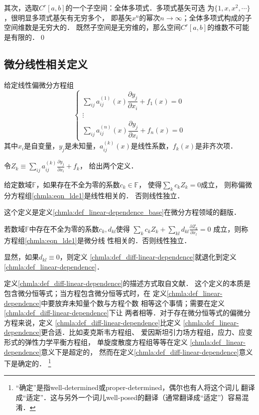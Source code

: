 其次，选取$C^r[a,b]$的一个子空间：全体多项式．多项式基矢可选
为$\{1,x,x^2,\cdots \}$，很明显多项式基矢有无穷多个，
即基矢$x^n$的幂次$n\to \infty$；全体多项式构成的子空间维数是无穷大的．
既然子空间是无穷维的，那么空间$C^r[a,b]$的维数不可能是有限的．\qed




\subsection{微分线性相关定义}\label{chmla:sec_diff-linear-dependence}
给定线性偏微分方程组
\begin{equation}\label{chmla:eqn_lde1}
    \left\{ {\begin{array}{*{20}{c}}
            \sum\limits_{ij} {a_{ij}^{( 1 )}(x)\dfrac{{\partial {y_j}}}{{\partial {x_i}}}}  + {f_1}(x) = 0  \\
            \vdots \\
            \sum\limits_{ij} {a_{ij}^{( n )}(x)\dfrac{{\partial {y_j}}}{{\partial {x_i}}}}  + {f_n}(x) = 0
    \end{array}} \right.
\end{equation}
其中$x_i$是自变量，$y_j$是未知量，$a_{ij}^{( k )}(x)$是线性系数，$f_k(x)$是非齐次项．

令${Z_k} \equiv\sum_{ij}{a_{ij}^{( k )}\frac{{\partial {y_j}}}{{\partial {x_i}}}}  + {f_k}$，
给出两个定义．
\begin{definition}\label{chmla:def_linear-dependence}
    给定数域$\mathbb{F}$，如果存在不全为零的系数$c_k\in \mathbb{F}$，
    使得$\sum_{k} {{c_k}{Z_k} = 0} $成立，
    则称偏微分方程组\eqref{chmla:eqn_lde1}是线性相关的．
    否则线性独立．
\end{definition}
这个定义是定义\ref{chmla:def_linear-dependence_base}在微分方程领域的翻版．
\begin{definition}\label{chmla:def_diff-linear-dependence}
    若数域$\mathbb{F}$中存在不全为零的系数${c_k},d_{kl}$使得
    $\sum_k {{c_k}{Z_k}}  + \sum_{kl} {{d_{kl}}
        \frac{{\partial {Z_k}}}{{\partial {x_l}}}} = 0$
    成立，则称方程组\eqref{chmla:eqn_lde1}是{\heiti 微分}线
    性相关的．否则线性独立．
\end{definition}
显然，如果$d_{kl}\equiv 0$，则定义
\ref{chmla:def_diff-linear-dependence}就退化到定义\ref{chmla:def_linear-dependence}．


定义\ref{chmla:def_diff-linear-dependence}的描述方式取自文献\parencite{liu2018}．
这个定义的本质是包含微分恒等式；当方程包含微分恒等式时，在
定义\ref{chmla:def_linear-dependence}中要放弃未知量个数与方程个数
相等这个事情；需要在定义\ref{chmla:def_diff-linear-dependence}下让
两者相等．对于存在微分恒等式的偏微分方程来说，定义
\ref{chmla:def_diff-linear-dependence}比定义
\ref{chmla:def_linear-dependence}更合适．比如麦克斯韦方程组、
爱因斯坦引力场方程组，应力、应变形式的弹性力学平衡方程组，
单旋度散度方程组等等在定义
\ref{chmla:def_linear-dependence}意义下是超定的，
然而在定义\ref{chmla:def_diff-linear-dependence}意义下是确定的．
{\footnote{“确定”是指well-determined或proper-determined，偶尔也有人将这个词儿
        翻译成“适定”．这与另外一个词儿well-posed的翻译（通常翻译成“适定”）容易混淆．}}

